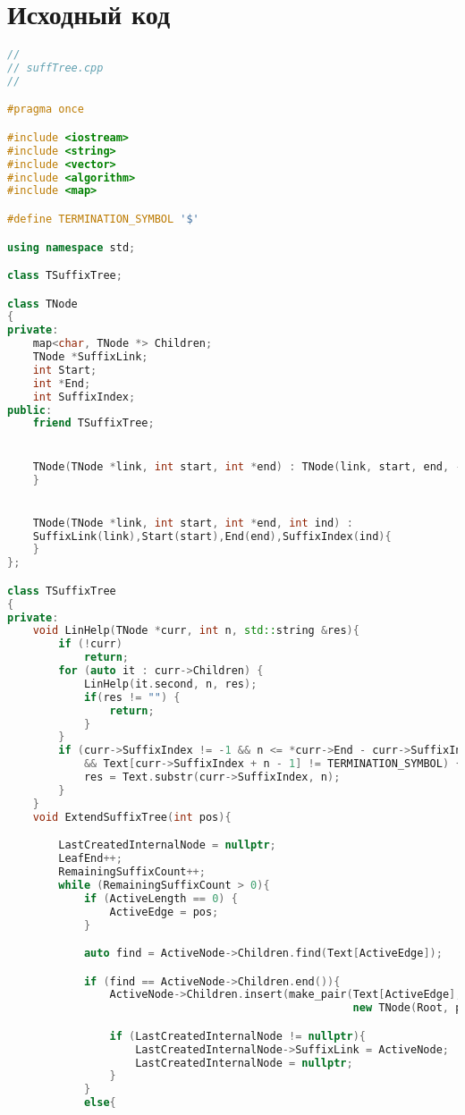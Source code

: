 \pagebreak
\section{Исходный код}
\begin{lstlisting}[language=C++]
//
// suffTree.cpp
//

#pragma once

#include <iostream>
#include <string>
#include <vector>
#include <algorithm>
#include <map>

#define TERMINATION_SYMBOL '$'

using namespace std;

class TSuffixTree;

class TNode
{
private:
    map<char, TNode *> Children; 
    TNode *SuffixLink;
    int Start;
    int *End;
    int SuffixIndex;
public:
    friend TSuffixTree;


    TNode(TNode *link, int start, int *end) : TNode(link, start, end, -1){
    }


    TNode(TNode *link, int start, int *end, int ind) :
    SuffixLink(link),Start(start),End(end),SuffixIndex(ind){
    }
};

class TSuffixTree
{
private:
    void LinHelp(TNode *curr, int n, std::string &res){
        if (!curr)
            return;
        for (auto it : curr->Children) {
            LinHelp(it.second, n, res);
            if(res != "") {
                return;
            }
        }
        if (curr->SuffixIndex != -1 && n <= *curr->End - curr->SuffixIndex + 1
            && Text[curr->SuffixIndex + n - 1] != TERMINATION_SYMBOL) {
            res = Text.substr(curr->SuffixIndex, n);
        }
    }
    void ExtendSuffixTree(int pos){

        LastCreatedInternalNode = nullptr;
        LeafEnd++;
        RemainingSuffixCount++;
        while (RemainingSuffixCount > 0){
            if (ActiveLength == 0) {
                ActiveEdge = pos;
            }

            auto find = ActiveNode->Children.find(Text[ActiveEdge]);

            if (find == ActiveNode->Children.end()){
                ActiveNode->Children.insert(make_pair(Text[ActiveEdge],
                                                      new TNode(Root, pos, &LeafEnd, pos - RemainingSuffixCount + 1)));

                if (LastCreatedInternalNode != nullptr){
                    LastCreatedInternalNode->SuffixLink = ActiveNode;
                    LastCreatedInternalNode = nullptr;
                }
            }
            else{


\end{lstlisting}
